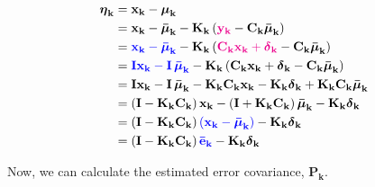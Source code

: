 \documentclass[12pt]{article}
\newcommand{\bvec}[1]{\mathbf{#1}} %
\newcommand{\mat}[1]{\mathbf{#1}}
\newcommand{\parentheses}[1]{\left(#1\right)}
\newcommand{\mb}[1]{{\boldsymbol{#1}}} %
\newcommand{\blue}[1]{\color{blue}#1\color{black}}
\newcommand{\magenta}[1]{\color{magenta}#1\color{black}}
\begin{document}
\begin{equation}
    \begin{aligned}
       \mb{\eta}_\mathbf{k} &= \bvec{x_k} - \mb{\mu}_\mathbf{k} \\
       &= \bvec{x_k} - \mb{\bar{\mu}}_\mathbf{k} - \mat{K_k}\parentheses{\magenta{\bvec{y_k}} - \mat{C_k}\mb{\bar{\mu}}_\mathbf{k}}\\
       &= \blue{\bvec{x_k} - \mb{\bar{\mu}}_\mathbf{k}} - \mat{K_k}\parentheses{\magenta{\mat{C_k}\bvec{x_k} + \mb{\delta}_\mathbf{k}} - \mat{C_k}\mb{\bar{\mu}}_\mathbf{k}}\\
       &= \blue{\mat{I}\bvec{x_k} - \mat{I}\,\mb{\bar{\mu}}_\mathbf{k}} - \mat{K_k}\parentheses{\mat{C_k}\bvec{x_k} + \mb{\delta}_\mathbf{k} - \mat{C_k}\mb{\bar{\mu}}_\mathbf{k}}\\
       &= \mat{I}\bvec{x_k} - \mat{I}\,\mb{\bar{\mu}}_\mathbf{k} - \mat{K_k}\mat{C_k}\bvec{x_k} - \mat{K_k}\mb{\delta}_\mathbf{k} + \mat{K_k}\mat{C_k}\mb{\bar{\mu}}_\mathbf{k}\\
       &= \parentheses{\mat{I} - \mat{K_k}\mat{C_k}}\bvec{x_k} - \parentheses{\mat{I} + \mat{K_k}\mat{C_k}}\mb{\bar{\mu}}_\mathbf{k} - \mat{K_k}\mb{\delta}_\mathbf{k}\\
       &= \parentheses{\mat{I} - \mat{K_k}\mat{C_k}} \blue{\parentheses{\bvec{x_k} - \mb{\bar{\mu}}_\mathbf{k}}} - \mat{K_k}\mb{\delta}_\mathbf{k}\\
       &= \parentheses{\mat{I} - \mat{K_k}\mat{C_k}} \blue{\bvec{\bar{e}_k}} - \mat{K_k}\mb{\delta}_\mathbf{k}\\
    \end{aligned}
    \label{eq:estimated-error}
\end{equation}

Now, we can calculate the estimated error covariance, $\mat{P_k}$.
\end{document}
